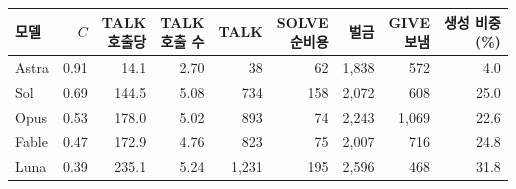 \begin{tabular}{lrrrrrrrr}
\toprule
모델 & $C$ & \shortstack{TALK\\호출당} & \shortstack{TALK\\호출 수} & TALK & \shortstack{SOLVE\\순비용} & 벌금 & \shortstack{GIVE\\보냄} & \shortstack{생성 비중\\(\%)} \\
\midrule
Astra & 0.91 & 14.1 & 2.70 & 38 & 62 & 1,838 & 572 & 4.0 \\
Sol & 0.69 & 144.5 & 5.08 & 734 & 158 & 2,072 & 608 & 25.0 \\
Opus & 0.53 & 178.0 & 5.02 & 893 & 74 & 2,243 & 1,069 & 22.6 \\
Fable & 0.47 & 172.9 & 4.76 & 823 & 75 & 2,007 & 716 & 24.8 \\
Luna & 0.39 & 235.1 & 5.24 & 1,231 & 195 & 2,596 & 468 & 31.8 \\
\bottomrule
\end{tabular}
